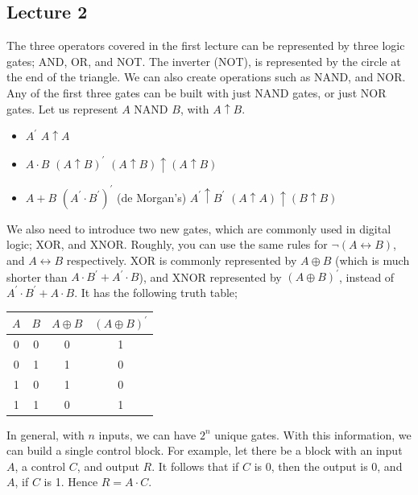 \documentclass[a4paper, 12pt]{article}
\begin{document}
        \subsection*{Lecture 2}
            The three operators covered in the first lecture can be represented by three logic gates; AND, OR, and NOT. The inverter (NOT), is represented by the circle at the end of the triangle. We can also create operations such as NAND, and NOR. Any of the first three gates can be built with just NAND gates, or just NOR gates. Let us represent $A$ NAND $B$, with $A \uparrow B$.
            \begin{itemize}
                \itemsep0em
                \item $A^\prime$ \hfill $A \uparrow A$
                \item $A \cdot B$ \hfill $(A \uparrow B)^\prime$
                    \subitem \hfill $(A \uparrow B) \uparrow (A \uparrow B)$
                \item $A + B$ \hfill $(A ^\prime \cdot B^\prime)^\prime$ (de Morgan's)
                    \subitem \hfill $A^\prime \uparrow B^\prime$
                    \subitem \hfill $(A \uparrow A) \uparrow (B \uparrow B)$
            \end{itemize}
            We also need to introduce two new gates, which are commonly used in digital logic; XOR, and XNOR. Roughly, you can use the same rules for $\neg (A \leftrightarrow B)$, and $A \leftrightarrow B$ respectively. XOR is commonly represented by $A \oplus B$ (which is much shorter than $A \cdot B^\prime + A^\prime \cdot B$), and XNOR represented by $(A \oplus B)^\prime$, instead of $A^\prime \cdot B^\prime + A \cdot B$. It has the following truth table;
            \begin{center}
                \begin{tabular}{cc|c|c}
                    $A$ & $B$ & $A \oplus B$ & $(A \oplus B)^\prime$ \\
                    \hline
                    0 & 0 & 0 & 1 \\
                    0 & 1 & 1 & 0 \\
                    1 & 0 & 1 & 0 \\
                    1 & 1 & 0 & 1
                \end{tabular}
            \end{center}
            In general, with $n$ inputs, we can have $2^n$ unique gates.
            With this information, we can build a single control block. For example, let there be a block with an input $A$, a control $C$, and output $R$. It follows that if $C$ is 0, then the output is 0, and $A$, if $C$ is 1. Hence $R = A \cdot C$.
            \medskip
\end{document}
